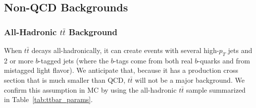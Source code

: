 









\subsection{Non-QCD Backgrounds}
\label{sec:non_qcd_bkgs}

\subsubsection{All-Hadronic $t\bar{t}$ Background}
When $t\bar{t}$ decays all-hadronically, it can create events with several high-$p_T$
jets and 2 or more $b$-tagged jets (where the $b$-tags come from both real $b$-quarks
and from mistagged light flavor).  We anticipate that, because it has a production
cross section that is much smaller than QCD, $t\bar{t}$ will not be a major background.
We confirm this assumption in MC by using the all-hadronic $t\bar{t}$ sample summarized
in Table~\ref{tab:ttbar_params}.


